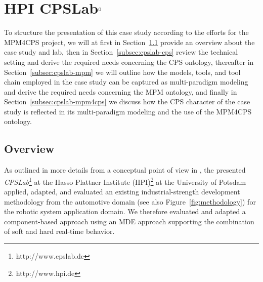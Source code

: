 \addtocounter{footnote}{1}
\section{HPI CPSLab$^{\thefootnote{}}$}


To structure the presentation of this case study according to the efforts for the MPM4CPS project, we will
%
at first in Section~\ref{subsec:cpslab-overview} provide an overview about the case study and lab,
%
then in Section~\ref{subsec:cpslab-cps} review the technical setting and derive the required needs concerning the CPS ontology,
%
thereafter in Section~\ref{subsec:cpslab-mpm} we will outline how the models, tools, and tool chain employed in the case study can be captured as multi-paradigm modeling and derive the required needs concerning the MPM ontology, and
%
finally in Section~\ref{subsec:cpslab-mpm4cps} we discuss how the CPS character of the case study is reflected in its multi-paradigm modeling and the use of the MPM4CPS ontology.

\subsection{Overview}\label{subsec:cpslab-overview}


As outlined in more details from a conceptual point of view in \cite{Waetzoldt:2012pa}, the presented \emph{CPSLab}\footnote{http://www.cpslab.de} at the Hasso Plattner Institute (HPI)\footnote{http://www.hpi.de} at the University of Potsdam applied, adapted, and evaluated an existing industrial-strength development methodology from the automotive domain \cite{Broekman&Notenboom2003} (see also Figure~\ref{fig:methodology}) for the robotic system application domain. We therefore evaluated and adapted a component-based approach using an MDE approach supporting the combination of soft and hard real-time behavior.


